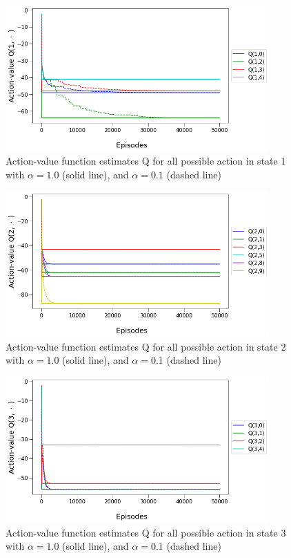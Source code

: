 \begin{figure}[hbt!]
    \centering
    \includegraphics[width=0.9\textwidth]{figures/Reinforcement/Q1.png}
    \caption{Action-value function estimates Q for all possible action in state 1 with $\alpha = 1.0$ (solid line), and $\alpha = 0.1$ (dashed line)}
    \label{fig:Q1 convergence}
\end{figure}

\begin{figure}[hbt!]
    \centering
    \includegraphics[width=0.9\textwidth]{figures/Reinforcement/Q2.png}
    \caption{Action-value function estimates Q for all possible action in state 2 with $\alpha = 1.0$ (solid line), and $\alpha = 0.1$ (dashed line)}
    \label{fig:Q2 convergence}
\end{figure}

\begin{figure}[hbt!]
    \centering
    \includegraphics[width=0.9\textwidth]{figures/Reinforcement/Q3.png}
    \caption{Action-value function estimates Q for all possible action in state 3 with $\alpha = 1.0$ (solid line), and $\alpha = 0.1$ (dashed line)}
    \label{fig:Q3 convergence}
\end{figure}


